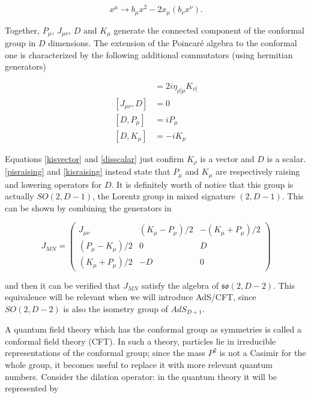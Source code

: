 \begin{equation}
	x^\mu \rightarrow b_\mu x^2 - 2x_\mu (b_\nu x^\nu).
	\label{}
\end{equation}

Together, $P_\mu$, $J_{\mu\nu}$, $D$ and $K_\mu$ generate the connected component of the conformal group in $D$ dimensions. The extension of the Poincar\'e algebra to the conformal one is characterized by the following additional commutators (using hermitian generators)

\begin{align}
	[J_{\mu\nu},K_\rho] 	&= 2i \eta_{\rho[\mu} K_{\nu]}	\label{kisvector}\\
	[J_{\mu\nu},D] 		&= 0 				\label{disscalar}\\
	[D, P_\mu] 		&= i P_\mu 			\label{pisraising}\\
	[D, K_\mu] 		&= -i K_\mu			\label{kisraising}
\end{align}

Equations \eqref{kisvector} and \eqref{disscalar} just confirm $K_\rho$ is a vector and $D$ is a scalar. \eqref{pisraising} and \eqref{kisraising} instead state that $P_\mu$ and $K_\mu$ are respectively raising and lowering operators for $D$. It is definitely worth of notice that this group is actually $SO(2,D-1)$, the Lorentz group in mixed signature $(2,D-1)$. This can be shown by combining the generators in

\begin{equation}
	J_{MN} = 
	\begin{pmatrix}
		J_{\mu\nu} 		& (K_\mu - P_\mu)/2	& - (K_\mu+P_\mu)/2 \\
		(P_\mu - K_\mu)/2	& 0			& D \\
		(K_\mu+P_\mu)/2		& -D			& 0
	\end{pmatrix}
	\label{}
\end{equation}

and then it can be verified that $J_{MN}$ satisfy the algebra of $\mathfrak{so}(2,D-2)$. This equivalence will be relevant when we will introduce AdS/CFT, since $SO(2,D-2)$ is also the isometry group of $AdS_{D+1}$.

A quantum field theory which has the conformal group as symmetries is called a conformal field theory (CFT). In such a theory, particles lie in irreducible representations of the conformal group; since the mass $P^2$ is not a Casimir for the whole group, it becomes useful to replace it with more relevant quantum numbers. Consider the dilation operator: in the quantum theory it will be represented by

